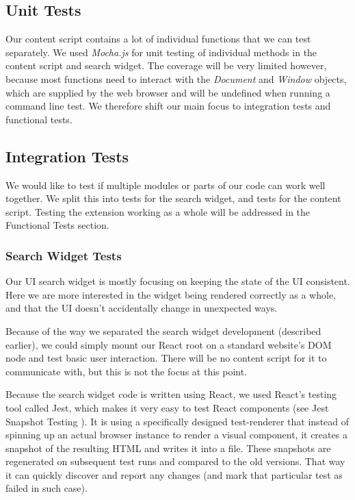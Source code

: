 \documentclass[bsc,frontabs,twoside,singlespacing,parskip,deptreport]{infthesis}
\begin{document}
\subsection{Unit Tests}
Our content script contains a lot of individual functions that we can test separately. We used \textit{Mocha.js} \cite{A12} for unit testing of individual methods in the content script and search widget. The coverage will be very limited however, because most functions need to interact with the \textit{Document} and \textit{Window} objects, which are supplied by the web browser and will be undefined when running a command line test. We therefore shift our main focus to integration tests and functional tests.

\subsection{Integration Tests}
We would like to test if multiple modules or parts of our code can work well together. We split this into tests for the search widget, and tests for the content script. Testing the extension working as a whole will be addressed in the Functional Tests section.

\subsubsection{Search Widget Tests}
Our UI search widget is mostly focusing on keeping the state of the UI consistent. Here we are more interested in the widget being rendered correctly as a whole, and that the UI doesn't accidentally change in unexpected ways.

Because of the way we separated the search widget development (described earlier), we could simply mount our React root on a standard website's DOM node and test basic user interaction. There will be no content script for it to communicate with, but this is not the focus at this point.

Because the search widget code is written using React, we used React's testing tool called Jest, which makes it very easy to test React components (see Jest Snapshot Testing \cite{A13}). It is using a specifically designed test-renderer that instead of spinning up an actual browser instance to render a visual component, it creates a snapshot of the resulting HTML and writes it into a file. These snapshots are regenerated on subsequent test runs and compared to the old versions. That way it can quickly discover and report any changes (and mark that particular test as failed in such case).
\end{document}

